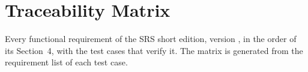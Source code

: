 \section{Traceability Matrix}\label{app:trace}
Every functional requirement of the SRS short edition, version \SRSversion, in the order of its Section~4, with the test cases that verify it. The matrix is generated from the requirement list of each test case.


